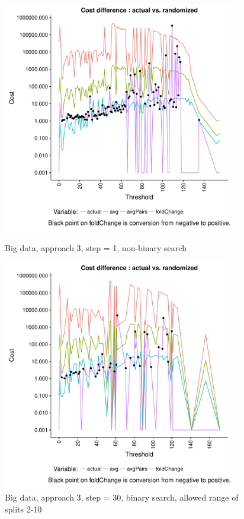 \documentclass[a4paper,10pt]{article}
\theoremstyle{plain}
\theoremstyle{definition}
\begin{document}
\begin{figure}[H]
	\centering
	\begin{minipage}{0.80\textwidth}
		\centering
		\includegraphics[width=0.9\textwidth]{./plots/plotCostGap/plotCostGapBigDataAp3Step1K5Seed42NoBinary.pdf}
		\caption{Big data, approach 3, step = 1, non-binary search}
		\label{fig:hcMaxGapBigDataAp3Step1NoBinary}
	\end{minipage}
	\begin{minipage}{0.80\textwidth}
		\centering
		\includegraphics[width=0.9\textwidth]{./plots/plotCostGap/plotCostGapBigDataAp3Step30K5Seed7Binary.pdf}
		\caption{Big data, approach 3, step = 30, binary search, allowed range of splits 2-10}
		\label{fig:hcMaxGapBigDataAp3Step30Binary}
	\end{minipage}
\end{figure}
\end{document}
